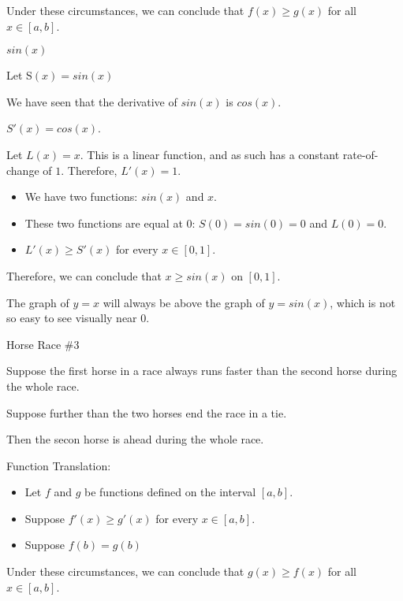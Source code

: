 \documentclass{ximera}
\begin{document}
Under these circumstances, we can conclude that $f(x) \geq g(x)$ for all $x \in [a,b]$.






\begin{example} $sin(x)$


Let S$(x) = sin(x)$

We have seen that the derivative of $sin(x)$ is $cos(x)$.

$S'(x) = cos(x)$.

Let $L(x) = x$.  This is a linear function, and as such has a constant rate-of-change of $1$.  Therefore, $L'(x) = 1$. 


\begin{itemize}
\item We have two functions: $sin(x)$ and $x$. 
\item These two functions are equal at $0$: $S(0) = sin(0) = 0$ and $L(0) = 0$.
\item $L'(x) \geq S'(x)$ for every $x \in [0,1]$.
\end{itemize}




Therefore, we can conclude that $x \geq sin(x)$ on $[0,1]$.

The graph of $y = x$ will always be above the graph of $y = sin(x)$, which is not so easy to see visually near $0$.





\begin{center}
\end{center}







\end{example}
























\begin{idea} Horse Race \#3

Suppose the first horse in a race always runs faster than the second horse during the whole race.

Suppose further than the two horses end the race in a tie.

Then the secon horse is ahead during the whole race.


\end{idea}





Function Translation:

\begin{itemize}
\item Let $f$ and $g$ be functions defined on the interval $[a, b]$. 
\item Suppose $f'(x) \geq g'(x)$ for every $x \in [a,b]$. 
\item Suppose $f(b) = g(b)$
\end{itemize}

Under these circumstances, we can conclude that $g(x) \geq f(x)$ for all $x \in [a,b]$.
\end{document}
